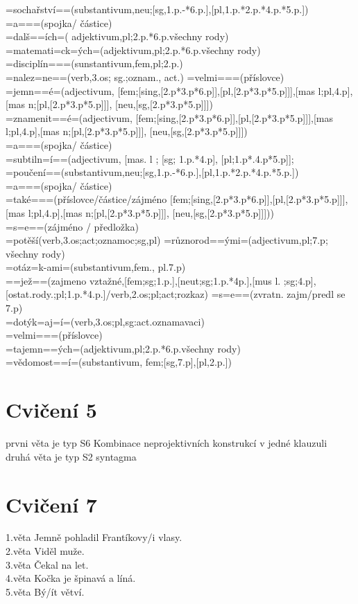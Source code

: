 \documentclass[12pt,a4paper]{article}
\theoremstyle{definition}
\begin{document}
=socha\v{r}stv\'{i}==(substantivum,neu;[sg,1.p.-*6.p.],[pl,1.p.*2.p.*4.p.*5.p.]) \\
=a===(spojka/ \v{c}\'{a}stice) \\
=dal\v{s}==\'{i}ch=( adjektivum,pl;2.p.*6.p.v\v{s}echny rody) \\
=matemati=ck=\'{y}ch=(adjektivum,pl;2.p.*6.p.v\v{s}echny rody) \\
=discipl\'{i}n===(sunstantivum,fem,pl;2.p.) \\
=nalez=ne==(verb,3.os; sg.;oznam., act.)
=velmi===(p\v{r}\'{i}slovce) \\
=jemn==\'{e}=(adjectivum, [fem;[sing,[2.p*3.p*6.p]],[pl,[2.p*3.p*5.p]]],[mas l;pl,4.p],[mas n;[pl,[2.p*3.p*5.p]]], [neu,[sg,[2.p*3.p*5.p]]])\\
=znamenit==\'{e}=(adjectivum, [fem;[sing,[2.p*3.p*6.p]],[pl,[2.p*3.p*5.p]]],[mas l;pl,4.p],[mas n;[pl,[2.p*3.p*5.p]]], [neu,[sg,[2.p*3.p*5.p]]])\\
=a===(spojka/ \v{c}\'{a}stice) \\
=subtiln=\'{i}==(adjectivum, [mas. l ; [sg; 1.p.*4.p], [pl;1.p*.4.p*5.p]]; \\
=pou\v{c}en\'{i}==(substantivum,neu;[sg,1.p.-*6.p.],[pl,1.p.*2.p.*4.p.*5.p.]) \\
=a===(spojka/ \v{c}\'{a}stice) \\
=tak\'{e}===(p\v{r}\'{i}slovce/\v{c}\'{a}stice/z\'{a}jm\'{e}no [fem;[sing,[2.p*3.p*6.p]],[pl,[2.p*3.p*5.p]]],[mas l;pl,4.p],[mas n;[pl,[2.p*3.p*5.p]]], [neu,[sg,[2.p*3.p*5.p]]])) \\
=s=e==(z\'{a}jm\'{e}no / p\v{r}edlo\v{z}ka) \\
=pot\v{e}\v{s}\'{i}(verb,3.os;act;oznamoc;sg,pl)
=r\r{u}znorod==\'{y}mi=(adjectivum,pl;7.p; v\v{s}echny rody) \\
=ot\'{a}z=k-ami=(substantivum,fem., pl.7.p) \\
==je\v{z}==(zajmeno vzta\v{z}n\'{e},[fem;sg;1.p.],[neut;sg;1.p.*4p.],[mus l. ;sg;4.p],[ostat.rody.;pl;1.p.*4.p.]/verb,2.os;pl;act;rozkaz)
=s=e==(zvratn. zajm/predl se 7.p) \\
=dot\'{y}k=aj=\'{i}=(verb,3.os;pl,sg:act.oznamavaci) \\
=velmi===(p\v{r}\'{i}slovce) \\
=tajemn==\'{y}ch=(adjektivum,pl;2.p.*6.p.v\v{s}echny rody) \\
=v\v{e}domost==\'{i}=(substantivum, fem;[sg,7.p],[pl,2.p.]) \\
\clearpage
\section{Cvi\v{c}en\'{i} 5 }
prvni v\v{e}ta je typ S6 Kombinace neprojektivn\'{i}ch konstrukc\'{i} v jedn\'{e} klauzuli \\
druh\'{a} v\v{e}ta je typ S2 syntagma \\
\section{Cvi\v{c}en\'{i} 7 }
1.v\v{e}ta Jemn\v{e} pohladil Frant\'{i}kovy/i vlasy. \\
2.v\v{e}ta Vid\v{e}l mu\v{z}e. \\
3.v\v{e}ta \v{C}ekal na let. \\
4.v\v{e}ta Ko\v{c}ka je \v{s}pinav\'{a} a l\'{i}n\'{a}. \\
5.v\v{e}ta B\'{y}/\'{i}t v\v{e}tv\'{i}. \\
\end{document}
